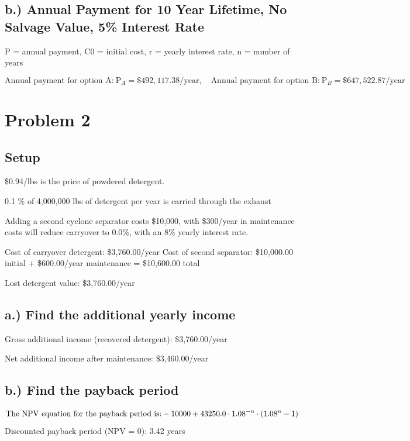 \documentclass{article}%
\begin{document}
%
\subsection*{b.) Annual Payment for 10 Year Lifetime, No Salvage Value, 5\% Interest Rate}%
\label{subsec:b.)AnnualPaymentfor10YearLifetime,NoSalvageValue,5InterestRate}%
P = annual payment, C0 = initial cost, r = yearly interest rate, n = number of years%
\par%
\[%
\text{Annual payment for option A:}\ \text{P}_A = \$492,117.38/\text{year},\quad \text{Annual payment for option B:}\ \text{P}_B = \$647,522.87/\text{year}%
\]

%
\section*{Problem 2}%
\label{sec:Problem2}%
\subsection*{Setup}%
\label{subsec:Setup}%
\$0.94/lbs is the price of powdered detergent.%
\par%
0.1 \% of 4,000,000 lbs of detergent per year is carried through the exhaust%
\par%
Adding a second cyclone separator costs \$10,000, with \$300/year in maintenance costs will reduce carryover to 0.0\%, with an 8\% yearly interest rate.%
\par%
Cost of carryover detergent: \$3,760.00/year\newline%
Cost of second separator: \$10,000.00 initial + \$600.00/year maintenance = \$10,600.00 total%
\par%
Lost detergent value: \$3,760.00/year%
\par

%
\subsection*{a.) Find the additional yearly income}%
\label{subsec:a.)Findtheadditionalyearlyincome}%
Gross additional income (recovered detergent): \$3,760.00/year%
\par%
Net additional income after maintenance: \$3,460.00/year%
\par

%
\subsection*{b.) Find the payback period}%
\label{subsec:b.)Findthepaybackperiod}%
\[%
\text{The NPV equation for the payback period is:\\} -10000 + 43250.0 \cdot {1.08}^{- n} \cdot \left({1.08}^{n} - 1\right)%
\]%
Discounted payback period (NPV = 0): 3.42 years%
\par
\end{document}
